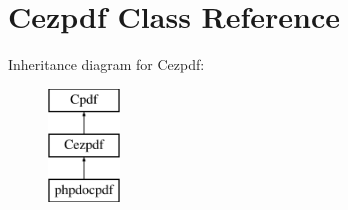 \hypertarget{class_cezpdf}{\section{\-Cezpdf \-Class \-Reference}
\label{class_cezpdf}
}
\-Inheritance diagram for \-Cezpdf\-:\begin{figure}[H]
\begin{center}
\leavevmode
\includegraphics[height=3.000000cm]{class_cezpdf}
\end{center}
\end{figure}
